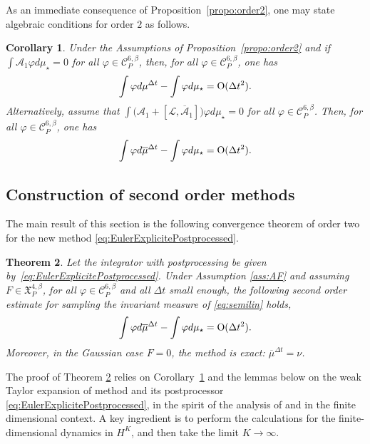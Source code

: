 \documentclass[11pt]{amsart}
\newcommand{\ts}{\thinspace}
\newtheorem{theo}{Theorem}[section]
\newtheorem{cor}[theo]{Corollary}
\begin{document}
As an immediate consequence of Proposition~\ref{propo:order2}, one may state algebraic conditions for order $2$ as follows.
\begin{cor}\label{cor:order2}
Under the Assumptions of Proposition~\ref{propo:order2} and if $\int\mathcal{A}_1\varphi d\mu_\star=0$ for all $\varphi\in\mathcal{C}^{6,\beta}_P$, then, for all $\varphi\in\mathcal{C}^{6,\beta}_P$, one has
\[
\int\varphi d\mu^{\Delta t}-\int\varphi d\mu_\star={\rm O}(\Delta t^2).
\]
%
Alternatively, assume that $\int\bigl(\mathcal{A}_1+[\mathcal{L},\overline{\mathcal{A}}_1]\bigr)\varphi d\mu_\star=0$ for all $\varphi\in\mathcal{C}^{6,\beta}_P$. Then, for all $\varphi\in\mathcal{C}^{6,\beta}_P$, one has
\[
\int\varphi d\overline{\mu}^{\Delta t}-\int\varphi d\mu_\star={\rm O}(\Delta t^2).
\]
\end{cor}
















\subsection{Construction of second order methods}
\label{sec:LM}

The main result of this section is the following convergence theorem of order two for the new method \eqref{eq:EulerExplicitePostprocessed}.

\begin{theo}
\label{theorem:high_order_inv_measure}
Let the integrator with postprocessing be given by~\eqref{eq:EulerExplicitePostprocessed}.
Under Assumption \ref{ass:AF} and assuming $F\in \mathfrak{X}^{4,\beta}_P$, for all $\varphi\in \mathcal{C}^{6,\beta}_P$ and all $\Delta t$ small enough, the following second order estimate for sampling the invariant measure of \eqref{eq:semilin} holds,
\[
\int\varphi d\overline{\mu}^{\Delta t}-\int\varphi d\mu_\star={\rm O}(\Delta t^2).
\]
Moreover, in the Gaussian case $F=0$, the method is exact: $\overline{\mu}^{\Delta t}=\nu$.
\end{theo}

The proof of Theorem \ref{theorem:high_order_inv_measure} relies on Corollary~\ref{cor:order2} and the lemmas below on the weak Taylor expansion of method and its postprocessor \eqref{eq:EulerExplicitePostprocessed}, in the spirit of the analysis of \cite[Sect.\ts 8]{Abdulle14hon} and \cite[Sect.\ts 7]{Vilmart15pif} in the finite dimensional context. A key ingredient is to perform the calculations for the finite-dimensional dynamics in $H^K$, and then take the limit $K\rightarrow\infty$.
\end{document}
